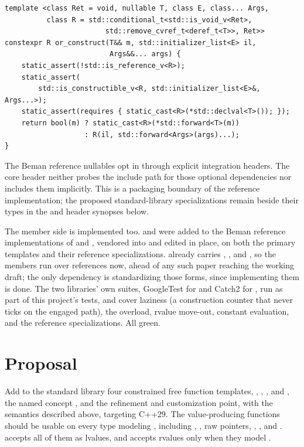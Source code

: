 \documentclass[a4paper,10pt,oneside,openany,final,article]{memoir}
\begin{document}
\begin{verbatim}
template <class Ret = void, nullable T, class E, class... Args,
          class R = std::conditional_t<std::is_void_v<Ret>,
                        std::remove_cvref_t<deref_t<T>>, Ret>>
constexpr R or_construct(T&& m, std::initializer_list<E> il,
                         Args&&... args) {
    static_assert(!std::is_reference_v<R>);
    static_assert(
        std::is_constructible_v<R, std::initializer_list<E>&, Args...>);
    static_assert(requires { static_cast<R>(*std::declval<T>()); });
    return bool(m) ? static_cast<R>(*std::forward<T>(m))
                   : R(il, std::forward<Args>(args)...);
}
\end{verbatim}

The Beman reference nullables opt in through explicit integration headers.
The core header neither probes the include path for those optional
dependencies nor includes them implicitly. This is a packaging boundary of
the reference implementation; the proposed standard-library specializations
remain beside their types in the  and 
header synopses below.

The member side is implemented too.  and
 were added to the Beman reference implementations of
 \cite{The_Beman_Project_beman_optional} and 
\cite{The_Beman_Project_beman_expected}, vendored into
 and edited in place, on both the primary
templates and their reference specializations.  already
carries , , and
, so the members run over references now, ahead of any
such paper reaching the working draft; the only dependency is standardizing
those forms, since implementing them is done. The two libraries' own suites,
GoogleTest for  and Catch2 for , run as
part of this project's tests, and cover laziness (a construction counter that never
ticks on the engaged path), the  overload, rvalue
move-out, constant evaluation, and the reference specializations. All green.

\chapter{Proposal}

Add to the standard library four constrained free function templates,
, , , and
, the named concept , and the
 refinement and customization point, with the
semantics described above, targeting C++29. The value-producing functions
should be usable on every type modeling , including
, , raw pointers,
, , and
.  accepts all of them as
lvalues, and accepts rvalues only when they model .
\end{document}
